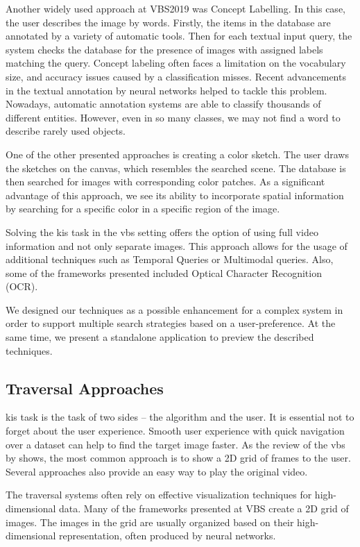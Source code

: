 Another widely used approach at VBS2019 was Concept Labelling. In this case, the user describes the image by words. Firstly, the items in the database are annotated by a variety of automatic tools. Then for each textual input query, the system checks the database for the presence of images with assigned labels matching the query. Concept labeling often faces a limitation on the vocabulary size, and accuracy issues caused by a classification misses. Recent advancements in the textual annotation by neural networks helped to tackle this problem. Nowadays, automatic annotation systems are able to classify thousands of different entities. However, even in so many classes, we may not find a word to describe rarely used objects.

One of the other presented approaches is creating a color sketch. The user draws the sketches on the canvas, which resembles the searched scene. The database is then searched for images with corresponding color patches. As a significant advantage of this approach, we see its ability to incorporate spatial information by searching for a specific color in a specific region of the image.
 
Solving the \acrshort{kis} task in the \acrshort{vbs} setting offers the option of using full video information and not only separate images. This approach allows for the usage of additional techniques such as Temporal Queries or Multimodal queries. Also, some of the frameworks presented included Optical Character Recognition (OCR).

We designed our techniques as a possible enhancement for a complex system in order to support multiple search strategies based on a user-preference. At the same time, we present a standalone application to preview the described techniques.

\subsection{Traversal Approaches}

\acrshort{kis} task is the task of two sides -- the algorithm and the user. It is essential not to forget about the user experience. Smooth user experience with quick navigation over a dataset can help to find the target image faster. As the review of the \acrshort{vbs} by \cite{rossetto2020interactive} shows, the most common approach is to show a 2D grid of frames to the user. Several approaches also provide an easy way to play the original video. 

The traversal systems often rely on effective visualization techniques for high-dimensional data. Many of the frameworks presented at VBS create a 2D grid of images. The images in the grid are usually organized based on their high-dimensional representation, often produced by neural networks. 


